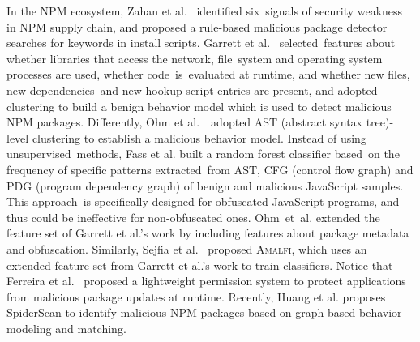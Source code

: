 In the NPM ecosystem, Zahan et al.~\cite{zahan2022weak} identified six~signals of security weakness in NPM supply chain, and proposed a rule-based malicious package detector  searches for keywords in install scripts. Garrett et al.~\cite{garrett2019detecting} selected~features about whether libraries that access the network, file~system and operating system processes are used, whether code~is~evaluated at runtime, and whether new files, new dependencies~and new hookup script entries are present, and adopted clustering to build a benign behavior model which is used to detect malicious NPM packages. Differently, Ohm et al.~\cite{ohm2020supporting}~adopted AST (abstract syntax tree)-level clustering to establish a malicious behavior model. Instead of using unsupervised~methods, Fass et al. \cite{fass2018jast, fass2019jstap} built a random forest classifier based~on the frequency of specific patterns extracted~from AST, CFG (control flow graph) and PDG (program dependency graph) of benign and malicious JavaScript samples. This approach~is specifically designed for obfuscated JavaScript programs, and thus could be ineffective for non-obfuscated ones. Ohm~et~al. \cite{ohm2022feasibility} extended the feature set of Garrett et al.'s work \cite{garrett2019detecting} by including features about package metadata and obfuscation. %
Similarly, Sejfia et al.~\cite{sejfia2022practical} proposed \textsc{Amalfi}, which uses an extended feature set from Garrett et al.'s work \cite{garrett2019detecting} to train classifiers.  Notice that Ferreira et al.~\cite{ferreira2021containing} proposed a lightweight permission system to protect applications from malicious package updates at runtime. Recently, Huang et al. \cite{huang2024spiderscan} proposes SpiderScan to identify malicious NPM packages based on graph-based behavior modeling and matching.

